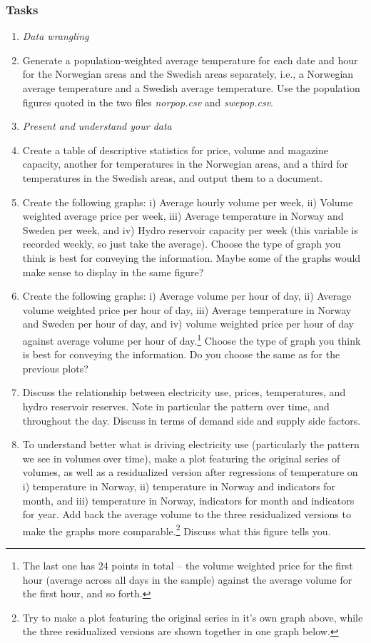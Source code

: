 \documentclass[12pt,a4paper]{article}
\begin{document}
\subsubsection*{Tasks}
\begin{enumerate}
 \item[] \emph{Data wrangling}
 \item Generate a population-weighted average temperature for each date and hour for the Norwegian areas and the Swedish areas separately, i.e., a Norwegian average temperature and a Swedish average temperature. Use the population figures quoted in the two files \emph{norpop.csv} and \emph{swepop.csv}.
 \item[] \emph{Present and understand your data}
\item Create a table of descriptive statistics for price, volume and magazine capacity, another for temperatures in the Norwegian areas, and a third for temperatures in the Swedish areas, and output them to a document.
\item Create the following graphs: i) Average hourly volume per week, ii) Volume weighted average price per week, iii) Average temperature in Norway and Sweden per week, and iv) Hydro reservoir capacity per week (this variable is recorded weekly, so just take the average). Choose the type of graph you think is best for conveying the information. Maybe some of the graphs would make sense to display in the same figure?
\item Create the following graphs: i) Average volume per hour of day, ii) Average volume weighted price per hour of day, iii) Average temperature in Norway and Sweden per hour of day, and iv) volume weighted price per hour of day against average volume per hour of day.\footnote{The last one has 24 points in total -- the volume weighted price for the first hour (average across all days in the sample) against the average volume for the first hour, and so forth.} Choose the type of graph you think is best for conveying the information. Do you choose the same as for the previous plots?
\item Discuss the relationship between electricity use, prices, temperatures, and hydro reservoir reserves. Note in particular the pattern over time, and throughout the day. Discuss in terms of demand side and supply side factors.
\item To understand better what is driving electricity use (particularly the pattern we see in volumes over time), make a plot featuring the original series of volumes, as well as a residualized version after regressions of temperature on i) temperature in Norway, ii) temperature in Norway and indicators for month, and iii) temperature in Norway, indicators for month and indicators for year. Add back the average volume to the three residualized versions to make the graphs more comparable.\footnote{Try to make a plot featuring the original series in it's own graph above, while the three residualized versions are shown together in one graph below.} Discuss what this figure tells you.

\end{enumerate}
\end{document}
